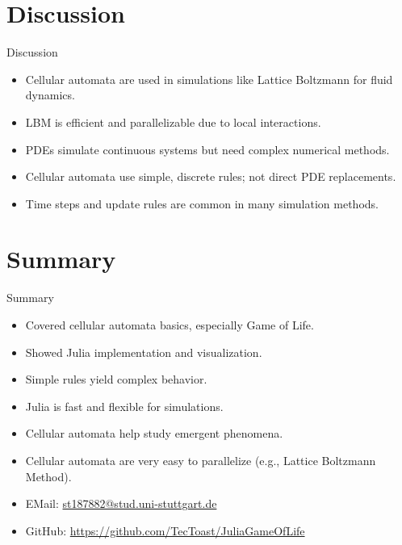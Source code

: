 \section{Discussion}
\begin{frame}{Discussion}
    \begin{itemize}
        \item Cellular automata are used in simulations like Lattice Boltzmann for fluid dynamics.
        \item LBM is efficient and parallelizable due to local interactions.
        \item PDEs simulate continuous systems but need complex numerical methods.
        \item Cellular automata use simple, discrete rules; not direct PDE replacements.
        \item Time steps and update rules are common in many simulation methods.
    \end{itemize}

\end{frame}


\section{Summary}
\begin{frame}{Summary}
    \begin{itemize}
        \item Covered cellular automata basics, especially Game of Life.
        \item Showed Julia implementation and visualization.
        \item Simple rules yield complex behavior.
        \item Julia is fast and flexible for simulations.
        \item Cellular automata help study emergent phenomena.
        \item Cellular automata are very easy to parallelize (e.g., Lattice Boltzmann Method).
              \vspace{1em}
        \item EMail: \url{st187882@stud.uni-stuttgart.de}
        \item GitHub: \url{https://github.com/TecToast/JuliaGameOfLife}
    \end{itemize}
\end{frame}